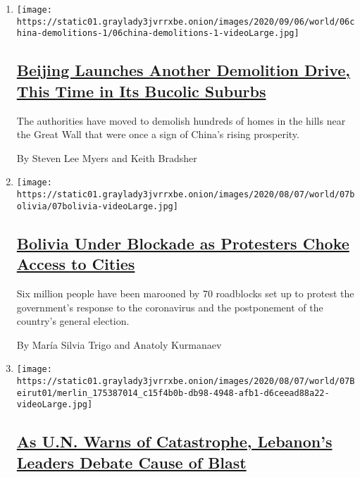 \begin{enumerate}
\def\labelenumi{\arabic{enumi}.}
\item
  \texttt{[image: https://static01.graylady3jvrrxbe.onion/images/2020/09/06/world/06china-demolitions-1/06china-demolitions-1-videoLarge.jpg]}

  \hypertarget{beijing-launches-another-demolition-drive-this-time-in-its-bucolic-suburbs}{%
  \subsection{\texorpdfstring{\href{/2020/08/07/world/asia/china-beijing-crackdown-housing.html}{Beijing
  Launches Another Demolition Drive, This Time in Its Bucolic
  Suburbs}}{Beijing Launches Another Demolition Drive, This Time in Its Bucolic Suburbs}}\label{beijing-launches-another-demolition-drive-this-time-in-its-bucolic-suburbs}}

  The authorities have moved to demolish hundreds of homes in the hills
  near the Great Wall that were once a sign of China's rising
  prosperity.

  By Steven Lee Myers and Keith Bradsher
\item
  \texttt{[image: https://static01.graylady3jvrrxbe.onion/images/2020/08/07/world/07bolivia/07bolivia-videoLarge.jpg]}

  \hypertarget{bolivia-under-blockade-as-protesters-choke-access-to-cities}{%
  \subsection{\texorpdfstring{\href{/2020/08/07/world/americas/bolivia-roadblock-blockade.html}{Bolivia
  Under Blockade as Protesters Choke Access to
  Cities}}{Bolivia Under Blockade as Protesters Choke Access to Cities}}\label{bolivia-under-blockade-as-protesters-choke-access-to-cities}}

  Six million people have been marooned by 70 roadblocks set up to
  protest the government's response to the coronavirus and the
  postponement of the country's general election.

  By María Silvia Trigo and Anatoly Kurmanaev
\item
  \texttt{[image: https://static01.graylady3jvrrxbe.onion/images/2020/08/07/world/07Beirut01/merlin\_175387014\_c15f4b0b-db98-4948-afb1-d6ceead88a22-videoLarge.jpg]}

  \hypertarget{as-un-warns-of-catastrophe-lebanons-leaders-debate-cause-of-blast}{%
  \subsection{\texorpdfstring{\href{/2020/08/07/world/europe/lebanon-catastrophe-explosion-external-interference.html}{As
  U.N. Warns of Catastrophe, Lebanon's Leaders Debate Cause of
  Blast}}{As U.N. Warns of Catastrophe, Lebanon's Leaders Debate Cause of Blast}}\label{as-un-warns-of-catastrophe-lebanons-leaders-debate-cause-of-blast}}


\end{enumerate}
